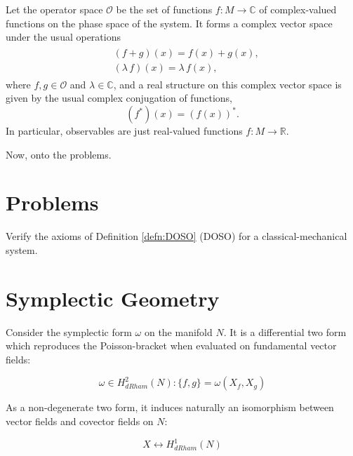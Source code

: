 \documentclass{amsart}
\newcommand{\R}{\mathbb{R}}
\newcommand{\C}{\mathbb{C}}
\newcommand{\cO}{\mathcal{O}}
\begin{document}
Let the operator space $\cO$ be the set of functions $f: M \to \C$ of complex-valued functions on the phase space of the system. It forms a complex vector space under the usual operations
\begin{align*} \begin{split}
    & (f + g)(x) = f(x) + g(x),\\
    & (\lambda \, f)(x) = \lambda \, f(x),
\end{split} \end{align*}
where $f, g \in \cO$ and $\lambda \in \C$, and a real structure on this complex vector space is given by the usual complex conjugation of functions,
\begin{equation*}
    (f^*)(x) = (f(x))^*.
\end{equation*}
In particular, observables are just real-valued functions $f: M \to \R$. 

Now, onto the problems.

\section*{Problems}

\begin{question}
Verify the axioms of Definition \ref{defn:DOSO} (DOSO) for a classical-mechanical system.
\end{question}

\section*{Symplectic Geometry}

Consider the symplectic form $\omega$ on the manifold $N$. It is a differential two form which reproduces the Poisson-bracket when evaluated on fundamental vector fields:

$$\omega \in H^2_{dRham}(N): \{f, g \} = \omega(X_{f}, X_{g})$$

As a non-degenerate two form, it induces naturally an isomorphism between vector fields and covector fields on $N$:

$$X \leftrightarrow H^{1}_{dRham}(N)$$


\end{document}
